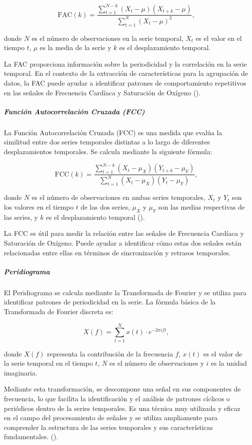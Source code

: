 \[
\text{FAC}(k) = \frac{\sum_{t=1}^{N-k}(X_t - \mu)(X_{t+k} - \mu)}{\sum_{t=1}^{N}(X_t - \mu)^2}
,\]

donde $N$ es el número de observaciones en la serie temporal, $X_t$ es el valor en el tiempo $t$, $\mu$ es la media de la serie y $k$ es el desplazamiento temporal.

La FAC proporciona información sobre la periodicidad y la correlación en la serie temporal. En el contexto de la extracción de características para la agrupación de datos, la FAC puede ayudar a identificar patrones de comportamiento repetitivos en las señales de Frecuencia Cardíaca y Saturación de Oxígeno (\cite{shumway2017chapter1}).

\subparagraph{Función Autocorrelación Cruzada (FCC)}

La Función Autocorrelación Cruzada (FCC) es una medida que evalúa la similitud entre dos series temporales distintas a lo largo de diferentes desplazamientos temporales. Se calcula mediante la siguiente fórmula:

\[
\text{FCC}(k) = \frac{\sum_{t=1}^{N-k}(X_t - \mu_X)(Y_{t+k} - \mu_Y)}{\sum_{t=1}^{N}(X_t - \mu_X)(Y_t - \mu_Y)}
,\]

donde $N$ es el número de observaciones en ambas series temporales, $X_t$ y $Y_t$ son los valores en el tiempo $t$ de las dos series, $\mu_X$ y $\mu_Y$ son las medias respectivas de las series, y $k$ es el desplazamiento temporal (\cite{shumway2017chapter1}).

La FCC es útil para medir la relación entre las señales de Frecuencia Cardíaca y Saturación de Oxígeno. Puede ayudar a identificar cómo estas dos señales están relacionadas entre ellas en términos de sincronización y retrasos temporales.

\subparagraph{Peridiograma}

El Peridiograma se calcula mediante la Transformada de Fourier y se utiliza para identificar patrones de periodicidad en la serie. La fórmula básica de la Transformada de Fourier discreta es:

\[
X(f) = \sum_{t=1}^{N} x(t) \cdot e^{-2\pi i f t}
,\]

donde $X(f)$ representa la contribución de la frecuencia $f$, $x(t)$ es el valor de la serie temporal en el tiempo $t$, $N$ es el número de observaciones y $i$ es la unidad imaginaria. 

Mediante esta transformación, se descompone una señal en sus componentes de frecuencia, lo que facilita la identificación y el análisis de patrones cíclicos o periódicos dentro de la series temporales. Es una técnica muy utilizada y eficaz en el campo del procesamiento de señales y se utiliza ampliamente para comprender la estructura de las series temporales y sus características fundamentales. (\cite{schuster1898investigation}).

